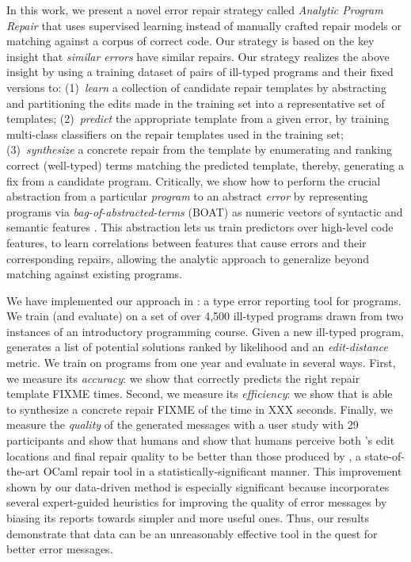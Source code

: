 %
In this work, we present a novel error repair
strategy called \emph{Analytic Program Repair}
that uses supervised learning instead of manually
crafted repair models or matching against a corpus
of correct code.
%
Our strategy is based on the key insight that
\emph{similar errors} have similar repairs.
%
Our strategy realizes the above insight by using
a training dataset of pairs of ill-typed programs
and their fixed versions to:
%
(1)~\emph{learn} a collection of candidate repair templates
    by abstracting and partitioning the edits made in the
    training set into a representative set of templates;
%
(2)~\emph{predict} the appropriate template from a given error,
    by training multi-class classifiers on the repair templates
    used in the training set;
%
(3)~\emph{synthesize} a concrete repair from the template
   by enumerating and ranking correct (\eg well-typed)
   terms matching the predicted template,
%
thereby, generating a fix from a candidate program.
%
Critically, we show how to perform the crucial abstraction
from a particular \emph{program} to an abstract \emph{error}
by representing programs via \emph{bag-of-abstracted-terms} (BOAT)
\ie as numeric vectors of syntactic and semantic features \cite{Seidel2017-ko}.
%
This abstraction lets us train predictors over high-level
code features, \ie to learn correlations between features
that cause errors and their corresponding repairs, allowing
the analytic approach to generalize beyond matching against
existing programs.

\mypara{\toolname}
%
We have implemented our approach in \toolname: a type error reporting
tool for \ocaml programs. We train (and evaluate) \toolname on a set of
over 4,500 ill-typed \ocaml programs drawn from two instances of an
introductory programming course.
%
Given a new ill-typed program, \toolname generates a list of potential
solutions ranked by likelihood and an \emph{edit-distance} metric.
We train \toolname on programs from one year and evaluate in several
ways.
%
First, we measure its \emph{accuracy}: we show that \toolname correctly
predicts the right repair template {FIXME} times.
%
Second, we measure its \emph{efficiency}: we show that \toolname is able
to synthesize a concrete repair {FIXME} of the time in XXX seconds.
%
Finally, we measure the \emph{quality} of the generated messages with
a user study with 29 participants and show that humans and show that
humans perceive both \toolname's edit locations and final repair quality
to be better than those produced by \seminal, a state-of-the-art OCaml
repair tool \cite{Lerner2007} in a statistically-significant manner.
%
This improvement shown by our data-driven method is especially 
significant because \seminal incorporates several expert-guided 
heuristics for improving the quality of error messages by biasing 
its reports towards simpler and more useful ones. 
%
Thus, our results demonstrate that data can be an unreasonably 
effective tool in the quest for better error messages.



